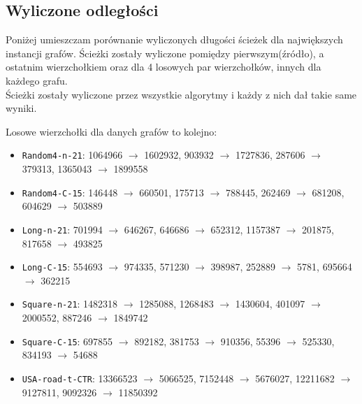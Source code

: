 \documentclass{article}
\begin{document}
\subsection{Wyliczone odległości}
Poniżej umieszczam porównanie wyliczonych długości ścieżek dla największych instancji grafów.
Ścieżki zostały wyliczone pomiędzy pierwszym(źródło), a ostatnim wierzchołkiem oraz dla 4 losowych par wierzchołków, innych dla każdego grafu. \\
Ścieżki zostały wyliczone przez wszystkie algorytmy i każdy z nich dał takie same wyniki.

\noindent Losowe wierzchołki dla danych grafów to kolejno:
\begin{itemize}
    \item \texttt{Random4-n-21}: 1064966 $\rightarrow$ 1602932, 903932 $\rightarrow$ 1727836, 287606 $\rightarrow$ 379313, 1365043 $\rightarrow$ 1899558 
    \item \texttt{Random4-C-15}: 146448 $\rightarrow$ 660501, 175713 $\rightarrow$ 788445, 262469 $\rightarrow$ 681208, 604629 $\rightarrow$ 503889
    \item \texttt{Long-n-21}: 701994 $\rightarrow$ 646267, 646686 $\rightarrow$ 652312, 1157387 $\rightarrow$ 201875, 817658 $\rightarrow$ 493825
    \item \texttt{Long-C-15}: 554693 $\rightarrow$ 974335, 571230 $\rightarrow$ 398987, 252889 $\rightarrow$ 5781, 695664 $\rightarrow$ 362215
    \item \texttt{Square-n-21}: 1482318 $\rightarrow$ 1285088, 1268483 $\rightarrow$ 1430604, 401097 $\rightarrow$ 2000552, 887246 $\rightarrow$ 1849742
    \item \texttt{Square-C-15}: 697855 $\rightarrow$ 892182, 381753 $\rightarrow$ 910356, 55396 $\rightarrow$ 525330, 834193 $\rightarrow$ 54688
    \item \texttt{USA-road-t-CTR}: 13366523 $\rightarrow$ 5066525, 7152448 $\rightarrow$ 5676027, 12211682 $\rightarrow$ 9127811, 9092326 $\rightarrow$ 11850392
\end{itemize}
\end{document}
